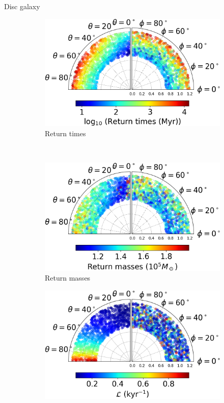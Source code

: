 \documentclass[handout]{beamer}
\begin{document}
\begin{frame}{Disc galaxy}
	\begin{figure}[h]
		\centering
		\begin{subfigure}[t]{0.35\textwidth}
			\includegraphics[width = \textwidth]{"../Files/Week 13/images/3_slides_time"}
			\caption{Return times}
		\end{subfigure}
		~ 
		\begin{subfigure}[t]{0.35\textwidth}
			\includegraphics[width=\textwidth]{"../Files/Week 13/images/3_slides_mass"}
			\caption{Return masses}
		\end{subfigure}
		\begin{subfigure}[t]{0.35\textwidth}
			\includegraphics[width=\textwidth]{"../Files/Week 13/images/3_slides_lyapunov"}

\end{subfigure}
\end{figure}
\end{frame}
\end{document}
